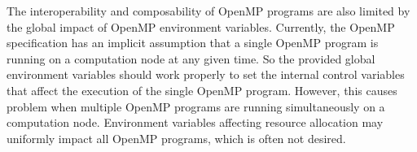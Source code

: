 The interoperability and composability of OpenMP programs are also limited by the global impact of OpenMP environment variables.
Currently, the OpenMP specification has an implicit assumption that a single OpenMP program is running on a computation node at any given time.
So the provided global environment variables should work properly to set the internal control variables that affect the execution
of the single OpenMP program. 
However, this causes problem when multiple OpenMP programs are running simultaneously on a computation node. 
Environment variables affecting resource allocation may uniformly impact all OpenMP programs, which is often not desired.
